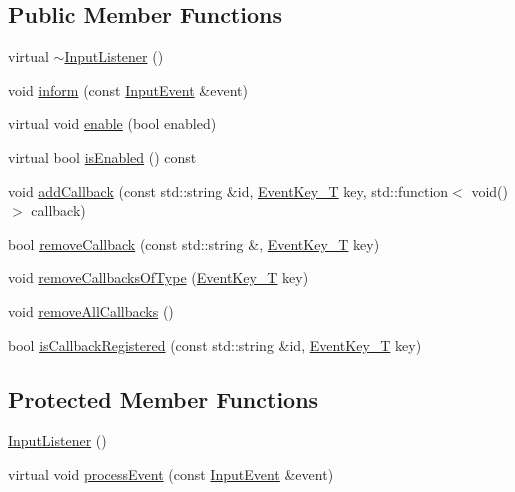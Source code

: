 \subsection*{Public Member Functions}
\begin{DoxyCompactItemize}
\item 
virtual \mbox{\hyperlink{classec_1_1_input_listener_afd65ca201e735f5758646d6653f42804}{$\sim$\+Input\+Listener}} ()
\item 
void \mbox{\hyperlink{classec_1_1_input_listener_a39e0803651e945e177336df2cf84d61b}{inform}} (const \mbox{\hyperlink{structec_1_1_input_event}{Input\+Event}} \&event)
\item 
virtual void \mbox{\hyperlink{classec_1_1_input_listener_a459a44443e7de70e854c2175b6c6914d}{enable}} (bool enabled)
\item 
virtual bool \mbox{\hyperlink{classec_1_1_input_listener_a6d7a4e04543e3a86745261d9fefcbfc1}{is\+Enabled}} () const
\item 
void \mbox{\hyperlink{classec_1_1_input_listener_a028ec5ed34aeb8b1377af91c2811bedb}{add\+Callback}} (const std\+::string \&id, \mbox{\hyperlink{namespaceec_a5de6bdb8c4b2ed6e590e721ec998f964}{Event\+Key\+\_\+T}} key, std\+::function$<$ void()$>$ callback)
\item 
bool \mbox{\hyperlink{classec_1_1_input_listener_a8b59eb3a5b89db5a59351cc9ea20c01a}{remove\+Callback}} (const std\+::string \&, \mbox{\hyperlink{namespaceec_a5de6bdb8c4b2ed6e590e721ec998f964}{Event\+Key\+\_\+T}} key)
\item 
void \mbox{\hyperlink{classec_1_1_input_listener_a3962c262607b3fc5ad1570c0c0f3a5c9}{remove\+Callbacks\+Of\+Type}} (\mbox{\hyperlink{namespaceec_a5de6bdb8c4b2ed6e590e721ec998f964}{Event\+Key\+\_\+T}} key)
\item 
void \mbox{\hyperlink{classec_1_1_input_listener_ab3c4085477da60677e0a0659f750ead4}{remove\+All\+Callbacks}} ()
\item 
bool \mbox{\hyperlink{classec_1_1_input_listener_aabb55b880fb8fbc1fb6d8606ec8ca867}{is\+Callback\+Registered}} (const std\+::string \&id, \mbox{\hyperlink{namespaceec_a5de6bdb8c4b2ed6e590e721ec998f964}{Event\+Key\+\_\+T}} key)
\end{DoxyCompactItemize}
\subsection*{Protected Member Functions}
\begin{DoxyCompactItemize}
\item 
\mbox{\hyperlink{classec_1_1_input_listener_aa44d25c2b2d3ef5e72611831fd66e10c}{Input\+Listener}} ()
\item 
virtual void \mbox{\hyperlink{classec_1_1_input_listener_a9ceaefc79c6b0b260e88454616137840}{process\+Event}} (const \mbox{\hyperlink{structec_1_1_input_event}{Input\+Event}} \&event)
\end{DoxyCompactItemize}
